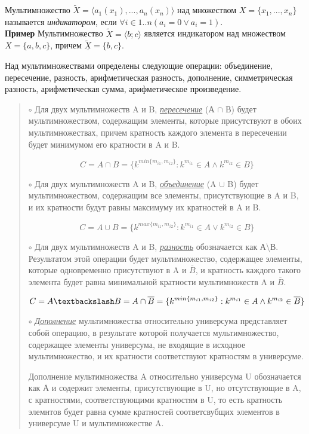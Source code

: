 \documentclass[10pt,a4paper,final]{article} %
\begin{document}
Мультимножество  $\tilde{X}=\langle a_1(x_1),...,a_n(x_n)\rangle$ над множеством $X=\{x_1,...,x_n\}$ называется \textit{индикатором}, если $\forall i \in 1..n (a_i =0 \lor a_i =1)$.\\
\textbf{Пример} Мультимножество $\tilde{X}=\langle b;c \rangle$ является индикатором над множеством $X=\{a,b,c\}$, причем $\tilde{\underline{X}}=\{b,c\}$.

\par Над мультимножествами определены следующие операции:  объединение, пересечение, разность, арифметическая разность, дополнение, симметрическая разность, арифметическая сумма, арифметическое произведение.

\begin{quote}
$\circ$ Для двух мультимножеств A и B, \textit{\underline{пересечение}} (А $\cap$ В) будет мультимножеством, содержащим элементы, которые присутствуют в обоих мультимножествах, причем кратность каждого элемента в пересечении будет минимумом его кратности в A и B.

$$C=A \cap B =\{k^{min\{m_{i1},m_{i2}\}}: k^{m_{i1}}\in A \land k^{m_{i2}}\in B \}$$


$\circ$ Для двух мультимножеств A и B, \textit{\underline{объединение}} (A $\cup$ B) будет мультимножеством, содержащим все элементы, присутствующие в A и B, и их кратности будут равны максимуму их кратностей в A и B.

$$C=A \cup B =\{k^{max\{m_{i1},m_{i2}\}}: k^{m_{i1}}\in A \lor k^{m_{i2}}\in B \}$$


$\circ$ Для двух мультимножеств A и B, \underline{\textit{разность}} обозначается как 
А\textbackslash В. Результатом этой операции будет мультимножество, содержащее элементы, которые одновременно присутствуют в A и $\overline{B}$, и кратность каждого такого элемента будет равна минимальной кратности мультимножеств A и $\overline{B}$. 

$$ C=A\textbackslash B=A \cap \overline{B}=\{k^{min\{m_{i1},m_{i2}\}} :k^{m_{i1}} \in A \land k^{m_{i2}} \in \overline{B} \}$$


$\circ$ \textit{\underline{Дополнение}} мультимножества относительно универсума представляет собой операцию, в результате которой получается мультимножество, содержащее элементы универсума, не входящие в исходное мультимножество, и их кратности соответствуют кратностям в универсуме.

Дополнение мультимножества A относительно универсума U обозначается как $\overline{\text{А}}$ и содержит элементы, присутствующие в U, но отсутствующие в A, с кратностями, соответствующими кратностям в U, то есть кратность элемнтов будет равна сумме кратностей соответсвубщих элементов в универсуме U и мультимножестве A.


\end{quote}
\end{document}
